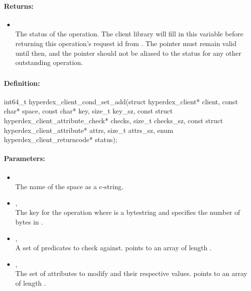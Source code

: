 \paragraph{Returns:}
\begin{itemize}[noitemsep]
\item {}\\
The status of the operation.  The client library will fill in this variable before returning this operation's request id from .  The pointer must remain valid until then, and the pointer should not be aliased to the status for any other outstanding operation.
\end{itemize}

\pagebreak
\subsubsection{}
\label{api:c:cond_set_add}


\paragraph{Definition:}
\begin{ccode}
int64_t hyperdex_client_cond_set_add(struct hyperdex_client* client,
        const char* space,
        const char* key, size_t key_sz,
        const struct hyperdex_client_attribute_check* checks, size_t checks_sz,
        const struct hyperdex_client_attribute* attrs, size_t attrs_sz,
        enum hyperdex_client_returncode* status);
\end{ccode}

\paragraph{Parameters:}
\begin{itemize}[noitemsep]
\item {}\\
The name of the space as a c-string.
\item {}, \\
The key for the operation where  is a bytestring and  specifies the number of bytes in .
\item {}, \\
A set of predicates to check against.   points to an array of length .
\item {}, \\
The set of attributes to modify and their respective values.   points to an array of length .
\end{itemize}

